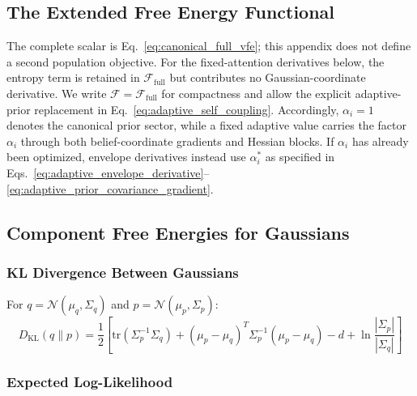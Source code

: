 \documentclass[12pt]{article}
\begin{document}
\subsection{The Extended Free Energy Functional}

The complete scalar is Eq.~\eqref{eq:canonical_full_vfe}; this appendix does not define a second population objective. For the fixed-attention derivatives below, the entropy term is retained in $\mathcal F_{\mathrm{full}}$ but contributes no Gaussian-coordinate derivative. We write $\mathcal F=\mathcal F_{\mathrm{full}}$ for compactness and allow the explicit adaptive-prior replacement in Eq.~\eqref{eq:adaptive_self_coupling}. Accordingly, $\alpha_i=1$ denotes the canonical prior sector, while a fixed adaptive value carries the factor $\alpha_i$ through both belief-coordinate gradients and Hessian blocks. If $\alpha_i$ has already been optimized, envelope derivatives instead use $\alpha_i^*$ as specified in Eqs.~\eqref{eq:adaptive_envelope_derivative}--\eqref{eq:adaptive_prior_covariance_gradient}.

\subsection{Component Free Energies for Gaussians}

\subsubsection{KL Divergence Between Gaussians}

For $q = \mathcal{N}(\mu_q, \Sigma_q)$ and $p = \mathcal{N}(\mu_p, \Sigma_p)$:
%
\begin{equation}
D_{\mathrm{KL}}(q \| p) = \frac{1}{2}\left[\mathrm{tr}(\Sigma_p^{-1}\Sigma_q) + (\mu_p - \mu_q)^T\Sigma_p^{-1}(\mu_p - \mu_q) - d + \ln\frac{|\Sigma_p|}{|\Sigma_q|}\right]
\label{eq:kl_gaussian}
\end{equation}

\subsubsection{Expected Log-Likelihood}
\end{document}
